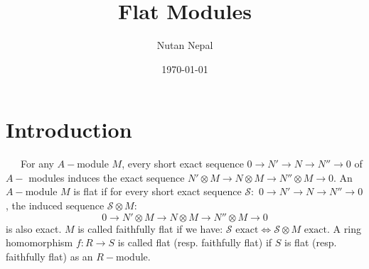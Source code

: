 \documentclass[12pt]{article}
\title{Flat Modules}
\author{Nutan Nepal}
\date{\today}
\theoremstyle{mytheoremstyle}
\begin{document}
\maketitle

\makebox[\linewidth]{\rule{200mm}{1pt}}
\vspace{1mm}
\section*{Introduction}
\ \ \ For any $A-$module $M$, every short exact sequence
$0\longrightarrow N'\longrightarrow N\longrightarrow N''
\longrightarrow 0$ of $A-$ modules induces the exact sequence
$ N'\otimes M\longrightarrow N\otimes M
\longrightarrow N''\otimes M\longrightarrow 0$.
An $A-$module $M$ is flat if for every short exact sequence
$\mathcal{S}:$
$0\longrightarrow N'\longrightarrow N\longrightarrow N''
\longrightarrow 0$, the induced sequence $\mathcal{S}\otimes M:$ 
$$0\longrightarrow N'\otimes M\longrightarrow N\otimes M
\longrightarrow N''\otimes M\longrightarrow 0$$
is also exact. $M$ is called faithfully flat if we have:
$\mathcal{S}\text{ exact}\iff \mathcal{S}\otimes M \text{ exact}.$
A ring homomorphism $f:R \to S$ is called flat (resp. faithfully flat)
if $S$ is flat (resp. faithfully flat) as
an $R-$module.
\end{document}
